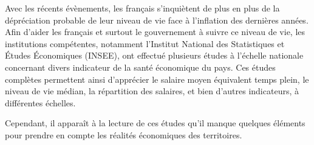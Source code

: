 Avec les récents évènements, les français s'inquiètent de plus en plus de la dépréciation probable de leur niveau de vie face à l'inflation des dernières années. Afin d'aider les français et surtout le gouvernement à suivre ce niveau de vie, les institutions compétentes, notamment l'Institut National des Statistiques et Études Économiques (INSEE), ont effectué plusieurs études à l'échelle nationale concernant divers indicateur de la santé économique du pays. Ces études complètes permettent ainsi d'apprécier le salaire moyen équivalent temps plein, le niveau de vie médian, la répartition des salaires, et bien d'autres indicateurs, à différentes échelles. 

Cependant, il apparaît à la lecture de ces études qu'il manque quelques éléments pour prendre en compte les réalités économiques des territoires.

